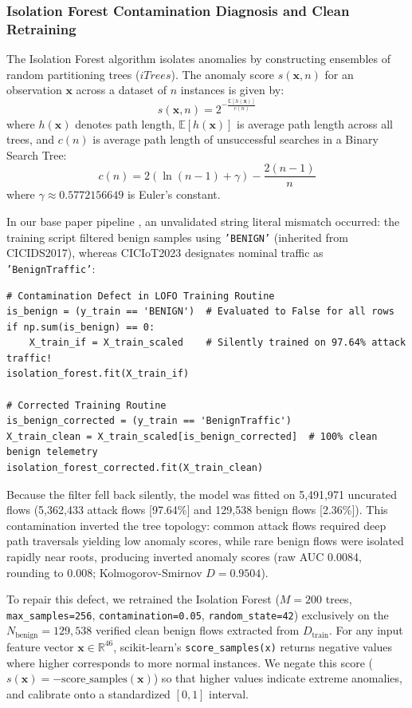 \documentclass[journal,10pt,onecolumn]{IEEEtran}
\begin{document}
\subsubsection{Isolation Forest Contamination Diagnosis and Clean Retraining}
The Isolation Forest algorithm isolates anomalies by constructing ensembles of random partitioning trees ($iTrees$). The anomaly score $s(\mathbf{x}, n)$ for an observation $\mathbf{x}$ across a dataset of $n$ instances is given by:
$$s(\mathbf{x}, n) = 2^{-\frac{\mathbb{E}[h(\mathbf{x})]}{c(n)}}$$
where $h(\mathbf{x})$ denotes path length, $\mathbb{E}[h(\mathbf{x})]$ is average path length across all trees, and $c(n)$ is average path length of unsuccessful searches in a Binary Search Tree:
$$c(n) = 2\left(\ln(n - 1) + \gamma\right) - \frac{2(n - 1)}{n}$$
where $\gamma \approx 0.5772156649$ is Euler's constant.

In our base paper pipeline \cite{1}, an unvalidated string literal mismatch occurred: the training script filtered benign samples using \texttt{'BENIGN'} (inherited from CICIDS2017), whereas CICIoT2023 designates nominal traffic as \texttt{'BenignTraffic'}:
\begin{verbatim}
# Contamination Defect in LOFO Training Routine
is_benign = (y_train == 'BENIGN')  # Evaluated to False for all rows
if np.sum(is_benign) == 0:
    X_train_if = X_train_scaled    # Silently trained on 97.64% attack traffic!
isolation_forest.fit(X_train_if)

# Corrected Training Routine
is_benign_corrected = (y_train == 'BenignTraffic')
X_train_clean = X_train_scaled[is_benign_corrected]  # 100% clean benign telemetry
isolation_forest_corrected.fit(X_train_clean)
\end{verbatim}

Because the filter fell back silently, the model was fitted on 5,491,971 uncurated flows (5,362,433 attack flows [97.64\%] and 129,538 benign flows [2.36\%]). This contamination inverted the tree topology: common attack flows required deep path traversals yielding low anomaly scores, while rare benign flows were isolated rapidly near roots, producing inverted anomaly scores (raw AUC 0.0084, rounding to 0.008; Kolmogorov-Smirnov $D = 0.9504$).

To repair this defect, we retrained the Isolation Forest ($M=200$ trees, \texttt{max\_samples=256}, \texttt{contamination=0.05}, \texttt{random\_state=42}) exclusively on the $N_{\text{benign}} = 129,538$ verified clean benign flows extracted from $D_{\text{train}}$. For any input feature vector $\mathbf{x} \in \mathbb{R}^{46}$, scikit-learn's \texttt{score\_samples(x)} returns negative values where higher corresponds to more normal instances. We negate this score ($s(\mathbf{x}) = -\text{score\_samples}(\mathbf{x})$) so that higher values indicate extreme anomalies, and calibrate onto a standardized $[0, 1]$ interval.
\end{document}
